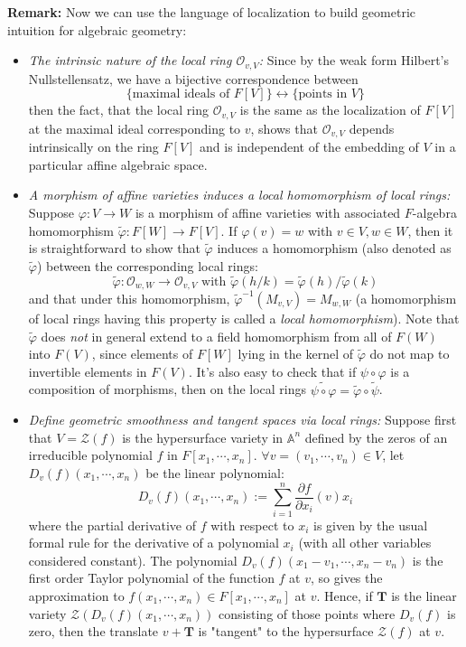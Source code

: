 \noindent\textbf{Remark:} Now we can use the language of localization to build geometric intuition for algebraic geometry:
\begin{itemize}
    \item \textit{The intrinsic nature of the local ring $\mathcal{O}_{v,V}$:} Since by the weak form Hilbert's Nullstellensatz, we have a bijective correspondence between
    \[
    \{ \text{maximal ideals of } F[V] \} \leftrightarrow \{ \text{points in }V\}
    \]
    then the fact, that the local ring $\mathcal{O}_{v,V}$ is the same as the localization of $F[V]$ at the maximal ideal corresponding to $v$, shows that $\mathcal{O}_{v,V}$ depends intrinsically on the ring $F[V]$ and is independent of the embedding of $V$ in a particular affine algebraic space.

    \item \textit{A morphism of affine varieties induces a local homomorphism of local rings:} Suppose $\varphi:V \to W$ is a morphism of affine varieties with associated $F$-algebra homomorphism $\widetilde{\varphi}: F[W] \to F[V]$. If $\varphi(v) =w$ with $v\in V,w\in W$, then it is straightforward to show that $\widetilde{\varphi}$ induces a homomorphism (also denoted as $\widetilde{\varphi}$) between the corresponding local rings:
    \[
    \widetilde{\varphi}: \mathcal{O}_{w,W} \to \mathcal{O}_{v,V} \text{ with } \widetilde{\varphi} (h/k)= \widetilde{\varphi}(h) / \widetilde{\varphi} (k)
    \]
    and that under this homomorphism, $\widetilde{\varphi}^{-1} (M_{v,V})= M_{w,W}$ (a homomorphism of local rings having this property is called a \textit{local homomorphism}). Note that $\widetilde{\varphi}$ does \textit{not} in general extend to a field homomorphism from all of $F(W)$ into $F(V)$, since elements of $F[W]$ lying in the kernel of $\widetilde{\varphi}$ do not map to invertible elements in $F(V)$. It's also easy to check that if $\psi \circ \varphi$ is a composition of morphisms, then on the local rings $\widetilde{\psi \circ \varphi} = \widetilde{\varphi} \circ \widetilde{\psi}$.

    \item \textit{Define geometric smoothness and tangent spaces via local rings:} Suppose first that $V= \mathcal{Z} (f)$ is the hypersurface variety in $\mathbb{A}^n$ defined by the zeros of an irreducible polynomial $f$ in $F[x_1 ,\cdots, x_n]$. $\forall v= (v_1 ,\cdots, v_n) \in V$, let $D_v(f) (x_1 ,\cdots, x_n)$ be the linear polynomial:
    \[
    D_v(f) (x_1 ,\cdots, x_n) := \sum_{i=1}^n \frac{\partial f}{\partial x_i} (v)x_i
    \]
    where the partial derivative of $f$ with respect to $x_i$ is given by the usual formal rule for the derivative of a polynomial $x_i$ (with all other variables considered constant). The polynomial $D_v(f) (x_1-v_1 ,\cdots, x_n-v_n)$ is the first order Taylor polynomial of the function $f$ at $v$, so gives the approximation to $f(x_1 ,\cdots, x_n) \in F[x_1 ,\cdots, x_n]$ at $v$. Hence, if $\mathbf{T}$ is the linear variety $\mathcal{Z} (D_v(f) (x_1 ,\cdots, x_n))$ consisting of those points where $D_v(f)$ is zero, then the translate $v+\mathbf{T}$ is "tangent" to the hypersurface $\mathcal{Z}(f)$ at $v$.
\end{itemize}

